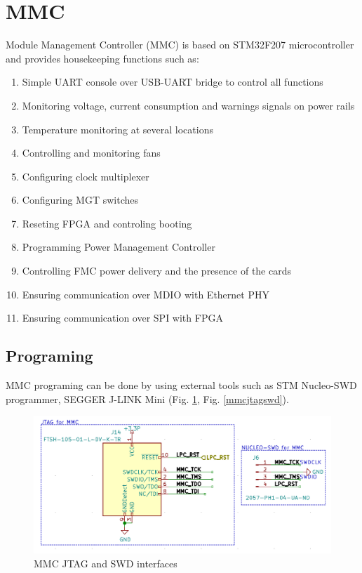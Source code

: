\documentclass[12pt,oneside,a4]{article}
\begin{document}
\section{MMC}
Module Management Controller (MMC) is based on STM32F207 microcontroller and provides housekeeping functions such as:
\begin{enumerate}
	\item Simple UART console over USB-UART bridge to control all functions
	\item Monitoring voltage, current consumption and warnings signals on power rails
	\item Temperature monitoring at several locations
	\item Controlling and monitoring fans
	\item Configuring clock multiplexer
	\item Configuring MGT switches
	\item Reseting FPGA and controling booting
	\item Programming Power Management Controller
	\item Controlling FMC power delivery and the presence of the cards
	\item Ensuring communication over MDIO with Ethernet PHY
	\item Ensuring communication over SPI with FPGA
\end{enumerate}

\subsection{Programing}
MMC programing can be done by using external tools such as STM Nucleo-SWD programmer, SEGGER J-LINK Mini (Fig. \ref{mmcjtag}, Fig. \ref{mmcjtagswd}).

\begin{figure}[H]
\begin{center}
\includegraphics[width=1\linewidth]{mmcjtag.png}
 \caption{MMC JTAG and SWD interfaces}\label{mmcjtag}
\end{center}
\end{figure}
\end{document}
